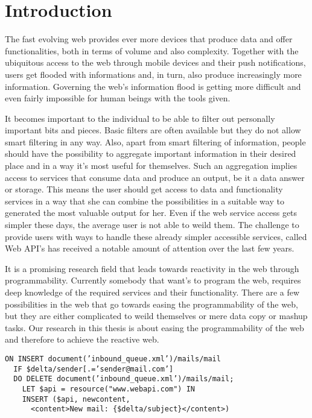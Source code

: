 \chapter{Introduction}
The fast evolving web provides ever more devices that produce data and offer functionalities, both in terms of volume and also complexity.
Together with the ubiquitous access to the web through mobile devices and their push notifications, users get flooded with informations and, in turn, also produce increasingly more information.
Governing the web's information flood is getting more difficult and even fairly impossible for human beings with the tools given.


It becomes important to the individual to be able to filter out personally important bits and pieces.
Basic filters are often available but they do not allow smart filtering in any way.
Also, apart from smart filtering of information, people should have the possibility to aggregate important information in their desired place and in a way it's most useful for themselves.
Such an aggregation implies access to services that consume data and produce an output, be it a data answer or storage.
This means the user should get access to data and functionality services in a way that she can combine the possibilities in a suitable way to generated the most valuable output for her.
Even if the web service access gets simpler these days, the average user is not able to weild them.
The challenge to provide users with ways to handle these already simpler accessible services, called Web API's has received a notable amount of attention over the last few years.



It is a promising research field that leads towards reactivity in the web through programmability.
Currently somebody that want's to program the web, requires deep knowledge of the required services and their functionality.
There are a few possibilities in the web that go towards easing the programmability of the web, but they are either complicated to weild themselves or mere data copy or mashup tasks.
Our research in this thesis is about easing the programmability of the web and therefore to achieve the reactive web. 

\begin{lstlisting}[frame=single,float=h,label=lst_rdf,language=RDF,caption=E-Mail Example rule expressed in RDF]
  ON INSERT document(’inbound_queue.xml’)/mails/mail
  IF $delta/sender[.=’sender@mail.com’]
  DO DELETE document(’inbound_queue.xml’)/mails/mail;
    LET $api = resource("www.webapi.com") IN
    INSERT ($api, newcontent,
      <content>New mail: {$delta/subject}</content>)
\end{lstlisting}

